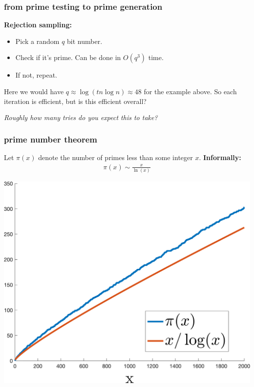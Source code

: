 \documentclass[handout,compress]{beamer}
\begin{document}


\begin{frame}
	\frametitle{from prime testing to prime generation}
	\textbf{Rejection sampling:}
	\begin{itemize}
		\item Pick a random $q$ bit number. 
		\item Check if it's prime. Can be done in $O(q^3)$ time.
		\item If not, repeat.
	\end{itemize}
	Here we would have $q \approx \log(tn\log n) \approx 48$ for the example above. So each iteration is efficient, but is this efficient overall?
	\begin{center}
		\emph{Roughly how many tries do you expect this to take?}
	\end{center}
\end{frame}

\begin{frame}
	\frametitle{prime number theorem}
 Let $\pi(x)$ denote the number of primes less than some integer $x$. 	\textbf{Informally:}
	\vspace{-.5em}
	\begin{align*}
		\pi(x) \sim \frac{x}{\ln(x)}
	\end{align*}
	\vspace{-1em}
	
	\begin{center}
		\includegraphics[width=.6\textwidth]{prime_number_theorem.png}
	\end{center}
\end{frame}
\end{document}
